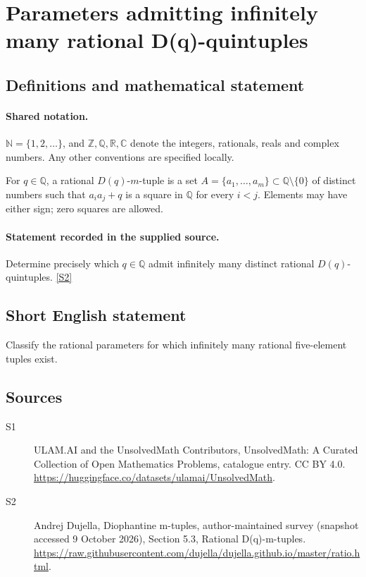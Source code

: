 \documentclass[11pt]{article}
\newcommand{\sref}[2]{\hyperlink{source:#1:#2}{[S#2]}}
\begin{document}
\section{Parameters admitting infinitely many rational D(q)-quintuples}\label{statement}

\subsection{Definitions and mathematical statement}

\paragraph{Shared notation.}$\mathbb N=\{1,2,\ldots\}$, and $\mathbb Z,\mathbb Q,\mathbb R,\mathbb C$ denote the integers, rationals, reals and complex numbers. Any other conventions are specified locally.


For $q\in\mathbb Q$, a rational $D(q)$-$m$-tuple is a set $A=\{a_1,\ldots,a_m\}\subset\mathbb Q\setminus\{0\}$ of distinct numbers such that $a_i a_j+q$ is a square in $\mathbb Q$ for every $i<j$. Elements may have either sign; zero squares are allowed.
\paragraph{Statement recorded in the supplied source.}
Determine precisely which $q\in\mathbb Q$ admit infinitely many distinct rational $D(q)$-quintuples. \sref{statement}{2}
\subsection{Short English statement}
Classify the rational parameters for which infinitely many rational five-element tuples exist.
\subsection{Sources}
\begin{description}
\item[\hypertarget{source:statement:1}{S1}] ULAM.AI and the UnsolvedMath Contributors, UnsolvedMath: A Curated Collection of Open Mathematics Problems, catalogue entry. CC BY 4.0. \url{https://huggingface.co/datasets/ulamai/UnsolvedMath}.
\item[\hypertarget{source:statement:2}{S2}] Andrej Dujella, Diophantine m-tuples, author-maintained survey (snapshot accessed 9 October 2026), Section 5.3, Rational D(q)-m-tuples. \url{https://raw.githubusercontent.com/dujella/dujella.github.io/master/ratio.html}.
\end{description}
\label{end:statement}
\end{document}
